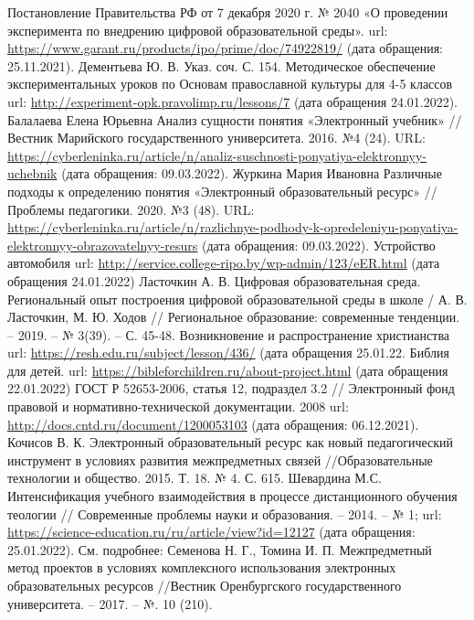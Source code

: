 \newpage
\large
\begin{thebibliography}{99}
  Постановление Правительства РФ от 7 декабря 2020 г. № 2040 «О проведении эксперимента по внедрению цифровой образовательной среды». url: \url{https://www.garant.ru/products/ipo/prime/doc/74922819/} (дата обращения: 25.11.2021).
  Дементьева Ю. В. Указ. соч. С. 154.
  Методическое обеспечение экспериментальных уроков по Основам православной культуры для 4-5 классов url: \url{http://experiment-opk.pravolimp.ru/lessons/7} (дата обращения 24.01.2022).
 Балалаева Елена Юрьевна Анализ сущности понятия «Электронный учебник» // Вестник Марийского государственного университета. 2016. №4 (24). URL: \url{https://cyberleninka.ru/article/n/analiz-suschnosti-ponyatiya-elektronnyy-uchebnik} (дата обращения: 09.03.2022).
Журкина Мария Ивановна Различные подходы к определению понятия «Электронный образовательный ресурс» // Проблемы педагогики. 2020. №3 (48). URL: \url {https://cyberleninka.ru/article/n/razlichnye-podhody-k-opredeleniyu-ponyatiya-elektronnyy-obrazovatelnyy-resurs} (дата обращения: 09.03.2022).
  Устройство автомобиля url: \url{http://service.college-ripo.by/wp-admin/123/eER.html} (дата обращения 24.01.2022)
  Ласточкин А. В. Цифровая образовательная среда. Региональный опыт построения цифровой образовательной среды в школе / А. В. Ласточкин, М. Ю. Ходов // Региональное образование: современные тенденции. – 2019. – № 3(39). – С. 45-48.
  Возникновение и распространение христианства url: \url{https://resh.edu.ru/subject/lesson/436/} (дата обращения 25.01.22.
  Библия для детей. url: \url{https://bibleforchildren.ru/about-project.html} (дата обращения 22.01.2022)
  ГОСТ Р 52653-2006, статья 12, подраздел 3.2 // Электронный фонд правовой и нормативно-технической документации. 2008 url: \url{http://docs.cntd.ru/document/1200053103} (дата обращения: 06.12.2021).
  Кочисов В. К. Электронный образовательный ресурс как новый педагогический инструмент в условиях развития межпредметных связей //Образовательные технологии и общество. 2015. Т. 18. № 4. С. 615.
  Шевардина М.С. Интенсификация учебного взаимодействия в процессе дистанционного обучения теологии // Современные проблемы науки и образования. – 2014. – № 1; url: \url{https://science-education.ru/ru/article/view?id=12127} (дата обращения: 25.01.2022).
  См. подробнее: Семенова Н. Г., Томина И. П. Межпредметный метод проектов в условиях комплексного использования электронных образовательных ресурсов //Вестник Оренбургского государственного университета. – 2017. – №. 10 (210).

\end{thebibliography}
